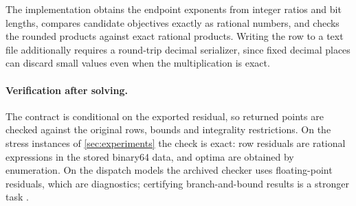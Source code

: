 The implementation obtains the endpoint exponents from integer ratios and bit lengths,
compares candidate objectives exactly as rational numbers, and checks the rounded products
against exact rational products. Writing the row to a text file additionally requires a
round-trip decimal serializer, since fixed decimal places can discard small values even when
the multiplication is exact.

\paragraph{Verification after solving.}
The contract is conditional on the exported residual, so returned points are checked against
the original rows, bounds and integrality restrictions. On the stress instances of
\cref{sec:experiments} the check is exact: row residuals are rational expressions in the stored
binary64 data, and optima are obtained by enumeration. On the dispatch models the archived
checker uses floating-point residuals, which are diagnostics; certifying branch-and-bound
results is a stronger task \cite{cheung2017certificates}.
